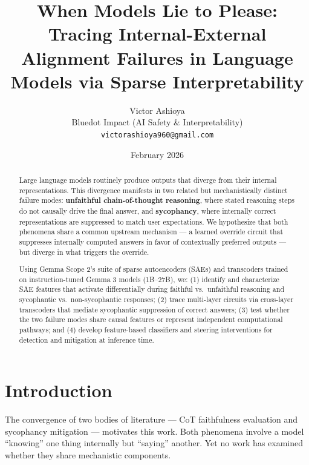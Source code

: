 \documentclass[11pt]{article}
\title{\textbf{When Models Lie to Please: Tracing Internal-External Alignment Failures in Language Models via Sparse Interpretability}}
\author{
  Victor Ashioya \\
  Bluedot Impact (AI Safety \& Interpretability) \\
  \texttt{victorashioya960@gmail.com}
}
\date{February 2026}
\begin{document}
\maketitle

\begin{abstract}
Large language models routinely produce outputs that diverge from their internal representations. This divergence manifests in two related but mechanistically distinct failure modes: \textbf{unfaithful chain-of-thought reasoning}, where stated reasoning steps do not causally drive the final answer, and \textbf{sycophancy}, where internally correct representations are suppressed to match user expectations. We hypothesize that both phenomena share a common upstream mechanism — a learned override circuit that suppresses internally computed answers in favor of contextually preferred outputs — but diverge in what triggers the override.

Using Gemma Scope 2's suite of sparse autoencoders (SAEs) and transcoders trained on instruction-tuned Gemma 3 models (1B--27B), we: (1) identify and characterize SAE features that activate differentially during faithful vs.\ unfaithful reasoning and sycophantic vs.\ non-sycophantic responses; (2) trace multi-layer circuits via cross-layer transcoders that mediate sycophantic suppression of correct answers; (3) test whether the two failure modes share causal features or represent independent computational pathways; and (4) develop feature-based classifiers and steering interventions for detection and mitigation at inference time.

\end{abstract}

\section{Introduction}
\label{sec:intro}


The convergence of two bodies of literature — CoT faithfulness evaluation and sycophancy mitigation — motivates this work. Both phenomena involve a model ``knowing'' one thing internally but ``saying'' another. Yet no work has examined whether they share mechanistic components.
\end{document}
